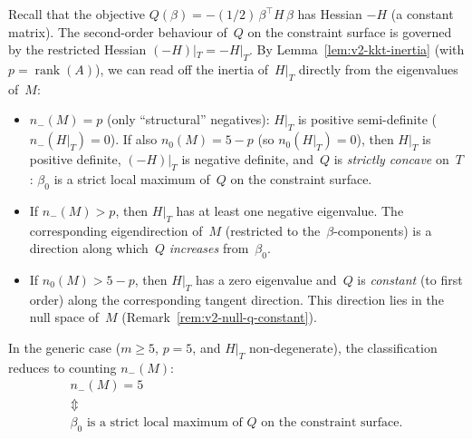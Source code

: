 \begin{remark}%
\label{rem:v2-eigenvalue-signs}
Recall that the objective
$Q(\beta) = -(1/2)\,\beta^\top H\,\beta$
has Hessian $-H$ (a constant matrix).
The second-order behaviour of~$Q$ on the constraint
surface is governed by the restricted Hessian
$(-H)|_T = -H|_T$.
By Lemma~\ref{lem:v2-kkt-inertia}
(with $p = \operatorname{rank}(A)$),
we can read off the inertia of~$H|_T$ directly from
the eigenvalues of~$M$:
\begin{itemize}
\item $n_-(M) = p$ (only ``structural''
  negatives): $H|_T$ is positive
  semi-definite ($n_-(H|_T) = 0$).
  If also $n_0(M) = 5 - p$
  (so $n_0(H|_T) = 0$),
  then $H|_T$ is positive definite,
  $(-H)|_T$ is negative definite,
  and~$Q$ is \emph{strictly concave} on~$T$:
  $\beta_0$ is a strict local maximum of~$Q$
  on the constraint surface.

\item If $n_-(M) > p$, then $H|_T$ has at least one
  negative eigenvalue.
  The corresponding eigendirection of~$M$
  (restricted to the~$\beta$-components) is a
  direction along which~$Q$ \emph{increases}
  from~$\beta_0$.

\item If $n_0(M) > 5 - p$, then $H|_T$ has a zero
  eigenvalue and~$Q$ is \emph{constant} (to first
  order) along the corresponding tangent direction.
  This direction lies in the null space of~$M$
  (Remark~\ref{rem:v2-null-q-constant}).
\end{itemize}
In the generic case ($m \geq 5$, $p = 5$, and $H|_T$
non-degenerate), the classification reduces to
counting $n_-(M)$:
\begin{gather*}
  n_-(M) = 5 \\
  \Updownarrow \\
  \text{$\beta_0$ is a strict local maximum
  of~$Q$ on the constraint surface.}
\end{gather*}
\end{remark}

